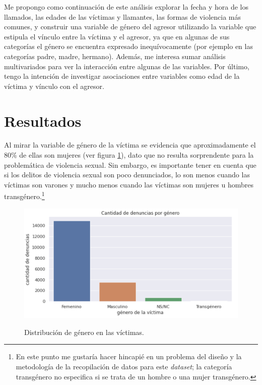 \documentclass[10 pt]{article}
\begin{document}
Me propongo como continuación de este análisis explorar la fecha y hora de los llamados, las edades de las víctimas y llamantes, las formas de violencia más comunes, y construir una variable de género del agresor utilizando la variable que estipula el vínculo entre la víctima y el agresor, ya que en algunas de sus categorías el género se encuentra expresado inequívocamente (por ejemplo en las categorías padre, madre, hermano). Además, me interesa sumar análisis multivariados para ver la interacción entre algunas de las variables. Por último, tengo la intención de investigar asociaciones entre variables como edad de la víctima y vínculo con el agresor.

\section{Resultados}\label{res}

Al mirar la variable de género de la víctima se evidencia que aproximadamente el 80\% de ellas son mujeres (ver figura \ref{generovict}), dato que no resulta sorprendente para la problemática de violencia sexual. Sin embargo, es importante tener en cuenta que si los delitos de violencia sexual son poco denunciados, lo son menos cuando las víctimas son varones y mucho menos cuando las víctimas son mujeres u hombres transgénero.\footnote{En este punto me gustaría hacer hincapié en un problema del diseño y la metodología de la recopilación de datos para este \textit{dataset}; la categoría transgénero no especifica si se trata de un hombre o una mujer transgénero. } 


\begin{figure}[H]
\begin{center}
\includegraphics[scale=.29]{imagenes/cantidad_denuncias_genero.png}
\vspace{1.5em}
\caption{Distribución de género en las víctimas.}
\vspace{1.5em}
\label{generovict}
\end{center}
\end{figure}
\end{document}
